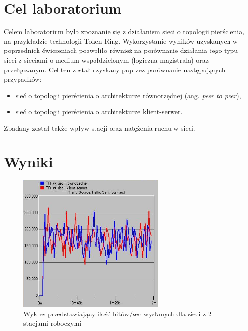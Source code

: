 \documentclass{article}
\begin{document}

\newpage
\section{Cel laboratorium}

Celem laboratorium było zpoznanie się z działaniem sieci o topologii pierścienia, na przykładzie technologii Token Ring. Wykorzystanie wyników uzyskanych w poprzednich ćwiczeniach pozwoliło również na porównanie działania tego typu sieci z sieciami o medium współdzielonym (logiczna magistrala) oraz przełączanym. Cel ten został uzyskany poprzez porównanie następujących przypadków:
\begin{itemize}
\item sieć o topologii pierścienia o architekturze równorzędnej (ang. \textit{peer to peer}),
\item sieć o topologii pierścienia o architekturze klient-serwer.

\end{itemize}
Zbadany został także wpływ stacji oraz natężenia ruchu w sieci.
\section{Wyniki}


\begin{figure}[H]
  \centering
  \includegraphics[width=0.65\textwidth]{screens/2_sent.png}
 \caption{Wykres przedstawiający ilość bitów/sec wysłanych dla sieci z 2 stacjami roboczymi}
 \label{fig:2s}
\end{figure}
\end{document}
